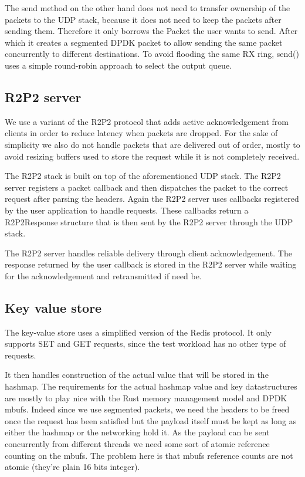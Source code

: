 The send method on the other hand does not need to transfer ownership
of the packets to the UDP stack, because it does not need to keep the
packets after sending them. Therefore it only borrows the Packet the
user wants to send. After which it creates a segmented DPDK packet to
allow sending the same packet concurrently to different destinations.
To avoid flooding the same RX ring, send() uses a simple round-robin
approach to select the output queue.

\subsection{R2P2 server} 

We use a variant of the R2P2 protocol that adds active acknowledgement
from clients in order to reduce latency when packets are dropped. For
the sake of simplicity we also do not handle packets that are
delivered out of order, mostly to avoid resizing buffers used to store
the request while it is not completely received.

The R2P2 stack is built on top of the aforementioned UDP stack. The
R2P2 server registers a packet callback and then dispatches the packet
to the correct request after parsing the headers. Again the R2P2
server uses callbacks registered by the user application to handle
requests. These callbacks return a R2P2Response structure that is then
sent by the R2P2 server through the UDP stack.

The R2P2 server handles reliable delivery through client
acknowledgement. The response returned by the user callback is stored
in the R2P2 server while waiting for the acknowledgement and
retransmitted if need be.

\subsection{Key value store}

The key-value store uses a simplified version of the Redis
protocol. It only supports SET and GET requests, since the test
workload has no other type of requests.


It then handles construction of the actual value that will be stored
in the hashmap. The requirements for the actual hashmap value and key
datastructures are mostly to play nice with the Rust memory management
model and DPDK mbufs. Indeed since we use segmented packets, we need
the headers to be freed once the request has been satisfied but the
payload itself must be kept as long as either the hashmap or the
networking hold it. As the payload can be sent concurrently from
different threads we need some sort of atomic reference counting on
the mbufs. The problem here is that mbufs reference counts are not
atomic (they're plain 16 bits integer).


